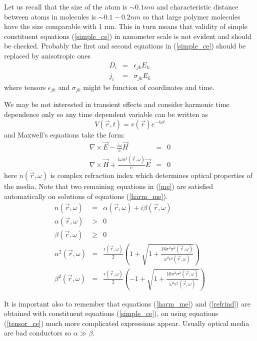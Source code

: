 \documentclass[12pt]{article}
\begin{document}
Let us recall that the size of the atom is $\sim 0.1 nm$ and characteristic distance between atoms in molecules is $\sim 0.1-0.2 nm$ so that large polymer molecules have the size comparable with 1 nm. This in turn means that validity of simple constituent equations (\ref{simple_ce}) in  nanometer  scale is not evident and should be checked. Probably the first and second equations  in  (\ref{simple_ce}) should be replaced by anisotropic ones
\begin{eqnarray}
 D_i&=&\epsilon_{jk} E_k \nonumber\\
j_i&=&\sigma_{jk} E_k \label{tensor_ce}
\end{eqnarray}
where tensors $\epsilon_{jk}$ and $\sigma_{jk}$ might be function of coordinates and time.

We may be not interested in transient effects and consider harmonic time dependence only so any time dependent variable can be written as
\begin{equation}
	V(\vec r,t)=v(\vec r) e^{-i\omega t}
\end{equation} 
and Maxwell's equations take the form:
\begin{eqnarray}
	\nabla \times \vec E -\frac{i \omega}{c}  \vec H &=& 0 \nonumber\\
	\nabla \times \vec H +\frac{i \omega n^2(\vec r,\omega)}{c} \vec E &=& 0 \label{harm_me}
\end{eqnarray}
here $n(\vec r,\omega)$ is complex refraction index which determines optical properties of the media. Note that two remaining equations in (\ref {me}) are satisfied automatically on solutions of equations (\ref{harm_me}). 
\begin{eqnarray}
	n(\vec r,\omega)&=&\alpha(\vec r,\omega)+i\beta(\vec r,\omega) \nonumber \\
	\alpha(\vec r,\omega) &>&0 \nonumber \\
	\beta(\vec r,\omega) &\ge & 0 \nonumber \\
	\alpha^2(\vec r,\omega)&=&\frac{\epsilon(\vec r,\omega)}{2}(1+\sqrt{1+\frac{16 \pi^2\sigma^2(\vec r,\omega)}{\omega^2\epsilon^2(\vec r,\omega)}}) \nonumber \\
	\beta^2(\vec r,\omega)&=&\frac{\epsilon(\vec r,\omega)}{2}(-1+\sqrt{1+\frac{16 \pi^2\sigma^2(\vec r,\omega)}{\omega^2\epsilon^2(\vec r,\omega)}}) \label{refrind}
\end{eqnarray}

 It is important also to remember that equations (\ref{harm_me}) and (\ref{refrind}) are obtained with constituent equations (\ref{simple_ce}), on using equations (\ref{tensor_ce}) much more complicated expressions appear. Usually optical media are bad conductors  so $\alpha\gg \beta$. 
\end{document}
